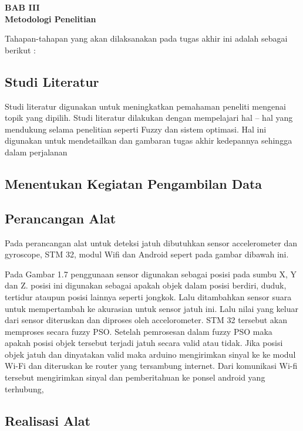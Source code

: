 \documentclass[11pt]{article}
\numberwithin{equation}{subsection}
\begin{document}
\begin{center}
	{\large \textbf{BAB III}} \\
	{\large \textbf{Metodologi Penelitian}}
\end{center}

Tahapan-tahapan yang akan dilaksanakan pada tugas akhir ini adalah sebagai berikut :
\subsection{Studi Literatur}

Studi literatur digunakan untuk meningkatkan pemahaman peneliti mengenai topik yang dipilih. Studi literatur dilakukan dengan mempelajari hal – hal yang mendukung selama penelitian seperti Fuzzy dan sistem optimasi. Hal ini digunakan untuk mendetailkan dan gambaran tugas akhir kedepannya  sehingga dalam perjalanan

\subsection{Menentukan Kegiatan Pengambilan Data}

\subsection{Perancangan Alat}
Pada perancangan alat untuk deteksi jatuh dibutuhkan sensor accelerometer dan gyroscope,
STM 32, modul Wifi dan Android sepert pada gambar dibawah ini.


Pada Gambar 1.7 penggunaan sensor digunakan sebagai posisi pada sumbu X, Y dan Z.
posisi ini digunakan sebagai apakah objek dalam posisi berdiri, duduk, tertidur ataupun posisi lainnya seperti jongkok.
Lalu ditambahkan sensor suara untuk mempertambah ke akurasian untuk sensor jatuh ini.
Lalu nilai yang keluar dari sensor diteruskan dan diproses oleh accelorometer.
STM 32 tersebut akan memproses secara fuzzy PSO.
Setelah pemrosesan dalam fuzzy PSO maka apakah posisi objek tersebut terjadi jatuh secara valid atau tidak. Jika posisi objek jatuh dan dinyatakan valid maka arduino mengirimkan sinyal ke ke modul Wi-Fi dan diteruskan ke router yang tersambung internet. 
Dari komunikasi Wi-fi tersebut mengirimkan sinyal dan pemberitahuan ke ponsel android yang terhubung,

\subsection{Realisasi Alat}
\end{document}

